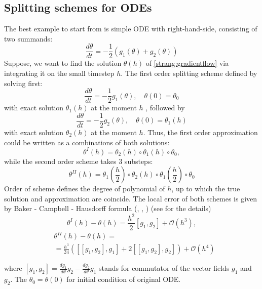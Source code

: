 \documentclass{article}
\begin{document}
\subsection{Splitting schemes for ODEs}
The best example to start from is simple ODE with right-hand-side, consisting of two summands:
\begin{equation}
    \frac{d \theta}{d t} = - \frac{1}{2} \left( g_1(\theta) + g_2(\theta)\right)
    \label{strang:gradientflow}
\end{equation}
Suppose, we want to find the solution $\theta(h)$ of \eqref{strang:gradientflow} via integrating it on the small timestep $h$. The first order splitting scheme defined by solving first:
$$
\frac{d \theta}{d t} = - \frac{1}{2} g_1(\theta), \quad \theta(0) = \theta_0
$$
with exact solution $\theta_1(h)$ at the moment $h$ , followed by
$$
\frac{d \theta}{d t} = - \frac{1}{2} g_2(\theta), \quad \theta(0) = \theta_1(h)
$$
with exact solution $\theta_2(h)$ at the moment $h$. Thus, the first order approximation could be written as a combinations of both solutions:
$$
\theta^I(h) = \theta_2(h) \circ \theta_1(h) \circ \theta_0,
$$
while the second order scheme takes 3 substeps:
$$
\theta^{II}(h) = \theta_1\left(\frac{h}{2}\right) \circ \theta_2(h) \circ \theta_1\left(\frac{h}{2}\right) \circ \theta_0
$$
Order of scheme defines the degree of polynomial of $h$, up to which the true solution and approximation are coincide. The local error of both schemes is given by Baker - Campbell - Hausdorff formula (\cite{baker1901further}, \cite{campbell1896law}, \cite{hausdorff1906symbolische}) (see \cite{macnamara2016operator} for the details)
\begin{equation}
    \label{strang:lie_error}
    \theta^I(h) - \theta(h) = \frac{h^2}{2} \left[g_{1}, g_{2}\right]  + \mathcal{O}(h^3),
\end{equation}
\begin{equation}
    \label{strang:marchuk_error}
    \begin{split}
    &\theta^{II}(h) - \theta(h) =\\&= \frac{h^{3}}{24} \left([[g_1, g_2], g_1]+2[[g_1, g_2], g_2]\right)+\mathcal{O}\left(h^{4}\right)
    \end{split}
\end{equation}

where $\left[ g_1, g_2\right] = \frac{d g_1}{d \theta} g_2 - \frac{d g_2}{d \theta} g_1 $ stands for commutator of the vector fields $g_1$ and $g_2$. The $\theta_0 = \theta(0)$ for initial condition of original ODE.
\end{document}
